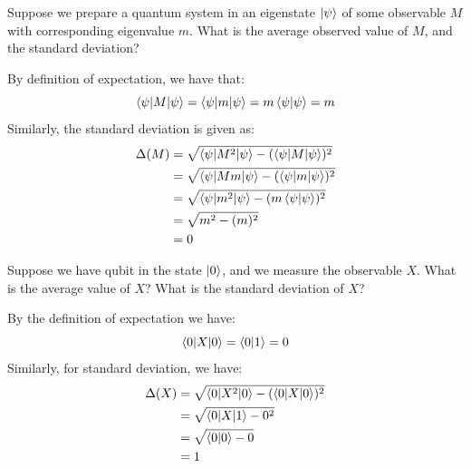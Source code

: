 \begin{example}
    Suppose we prepare a quantum system in an eigenstate $\ket{\psi}$ of some observable $M$ with corresponding eigenvalue $m$. What is the average observed value of $M$, and the standard deviation?

    By definition of expectation, we have that:
    \[
    \braket{\psi|M|\psi}=\braket{\psi|m|\psi}=m\braket{\psi|\psi}=m
    \]
    Similarly, the standard deviation is given as:
    \begin{align*}
        \Delta(M)&=\sqrt{\braket{\psi|M^2|\psi}-(\braket{\psi|M|\psi})^2}\\
        &=\sqrt{\braket{\psi|Mm|\psi}-(\braket{\psi|m|\psi})^2}\\
        &=\sqrt{\braket{\psi|m^2|\psi}-(m\braket{\psi|\psi})^2}\\
        &=\sqrt{m^2 - (m)^2}\\
        &=0
    \end{align*}
\end{example}
\begin{example}
    Suppose we have qubit in the state $\ket{0}$, and we measure the observable $X$. What is the average value of $X$? What is the standard deviation of $X$?

    By the definition of expectation we have:
    \[
    \braket{0|X|0}=\braket{0|1}=0
    \]
    Similarly, for standard deviation, we have:
    \begin{align*}
    \Delta(X)&=\sqrt{\braket{0|X^2|0}-(\braket{0|X|0})^2}\\
    &=\sqrt{\braket{0|X|1}-0^2}\\
    &=\sqrt{\braket{0|0}-0}\\
    &=1
    \end{align*}
\end{example}

